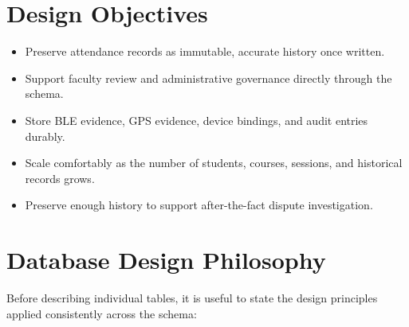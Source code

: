\documentclass[12pt, a4paper, oneside]{report}
\begin{document}
\section{Design Objectives}
\begin{itemize}
    \item Preserve attendance records as immutable, accurate history once written.
    \item Support faculty review and administrative governance directly through the schema.
    \item Store BLE evidence, GPS evidence, device bindings, and audit entries durably.
    \item Scale comfortably as the number of students, courses, sessions, and historical records grows.
    \item Preserve enough history to support after-the-fact dispute investigation.
\end{itemize}

\section{Database Design Philosophy}

Before describing individual tables, it is useful to state the design principles applied consistently across the schema:
\end{document}

